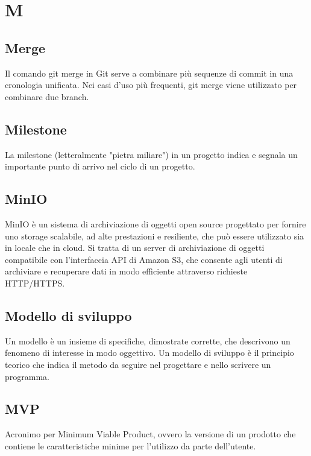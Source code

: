 \chapter{M}

\section{Merge}
Il comando git merge in Git serve a combinare più sequenze di commit in una cronologia unificata. Nei casi d’uso più frequenti, git merge viene utilizzato per combinare due branch.

\section{Milestone}
La milestone (letteralmente "pietra miliare") in un progetto indica e segnala un importante punto di arrivo nel ciclo di un progetto.

\section{MinIO}
MinIO è un sistema di archiviazione di oggetti open source progettato per fornire uno storage scalabile, ad alte prestazioni e resiliente, che può essere utilizzato sia in locale che in cloud. Si tratta di un server di archiviazione di oggetti compatibile con l'interfaccia API di Amazon S3, che consente agli utenti di archiviare e recuperare dati in modo efficiente attraverso richieste HTTP/HTTPS.

\section{Modello di sviluppo}\label{sec:Modelli di sviluppo}
Un modello è un insieme di specifiche, dimostrate corrette, che descrivono un fenomeno di interesse in modo oggettivo. Un modello di sviluppo è il principio teorico che indica il metodo da seguire nel progettare e nello scrivere un programma.

\section{MVP}\label{sec:Minimum Viable Product}
Acronimo per Minimum Viable Product, ovvero la versione di un prodotto che contiene le caratteristiche minime per l'utilizzo da parte dell'utente.
